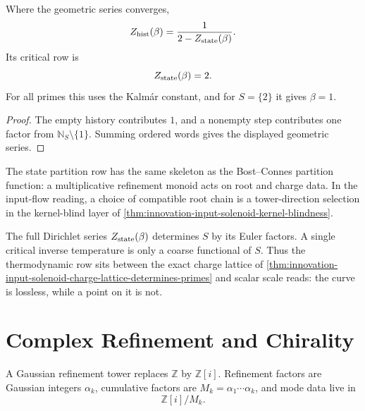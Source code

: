 \begin{theorem}
\label{thm:innovation-input-modular-history-critical-row}
Where the geometric series converges,
$$
Z_{\rm hist}(\beta)
=
\frac{1}{2-Z_{\rm state}(\beta)}.
$$
Its critical row is
$$
Z_{\rm state}(\beta)=2.
$$
For all primes this uses the Kalmár constant, and for $S=\{2\}$ it gives
$\beta=1$.
\end{theorem}

\begin{proof}
The empty history contributes $1$, and a nonempty step contributes one
factor from $\mathbb N_S\setminus\{1\}$. Summing ordered words gives the
displayed geometric series.
\end{proof}

\begin{principle}
\label{prin:innovation-input-modular-bost-connes-interface}
The state partition row has the same skeleton as the Bost--Connes
partition function: a multiplicative refinement monoid acts on root and
charge data. In the input-flow reading, a choice of compatible root chain
is a tower-direction selection in the kernel-blind layer of
\autoref{thm:innovation-input-solenoid-kernel-blindness}.
\end{principle}

\begin{principle}
\label{prin:innovation-input-modular-thermal-fingerprint-levels}
The full Dirichlet series $Z_{\rm state}(\beta)$ determines $S$ by its
Euler factors. A single critical inverse temperature is only a coarse
functional of $S$. Thus the thermodynamic row sits between the exact charge
lattice of
\autoref{thm:innovation-input-solenoid-charge-lattice-determines-primes}
and scalar scale reads: the curve is lossless, while a point on it is not.
\end{principle}

\section{Complex Refinement and Chirality}
\label{sec:innovation-input-modular-complex-refinement}

\begin{definition}
\label{def:innovation-input-modular-gaussian-refinement-tower}
A Gaussian refinement tower replaces $\mathbb Z$ by $\mathbb Z[i]$.
Refinement factors are Gaussian integers $\alpha_k$, cumulative factors are
$M_k=\alpha_1\cdots\alpha_k$, and mode data live in
$$
\mathbb Z[i]/M_k.
$$
\end{definition}

